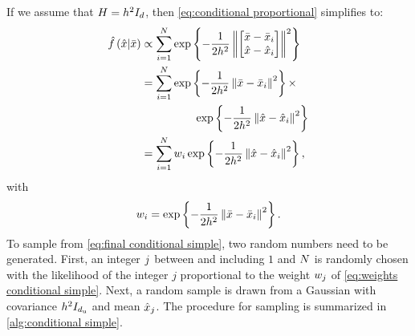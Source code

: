If we assume that $H=h^2I_{d}$, then \cref{eq:conditional proportional} simplifies to:
\begin{align}
	\densityestcond{\variablepartb}{\variableparta} 
	&\propto \sum_{\indexdata=1}^{\numberofsamples}
	\e{
		-\frac{1}{2h^2} \normtwo{
			\begin{bmatrix}
				\variableparta - \datapointparta{\indexdata} \\ 
				\variablepartb - \datapointpartb{\indexdata}
			\end{bmatrix}
		}^2
	} \nonumber \\
	&= \sum_{\indexdata=1}^{\numberofsamples}
	\e{-\frac{1}{2h^2} \normtwo{\variableparta - \datapointparta{\indexdata}}^2} \times \nonumber \\
	& \superquad \e{-\frac{1}{2h^2} \normtwo{\variablepartb - \datapointpartb{\indexdata}}^2} \nonumber \\
	&= \sum_{\indexdata=1}^{\numberofsamples} \weight{\indexdata}
	\e{-\frac{1}{2h^2} \normtwo{\variablepartb - \datapointpartb{\indexdata}}^2}, \label{eq:final conditional simple}
\end{align}
with 
\begin{equation}
	\label{eq:weights conditional simple}
	w_{i}=\exp\left\{ -\frac{1}{2h^2} \left\Vert \bar{x} - \bar{x}_{i} \right\Vert^2 \right\}.
\end{equation} 
To sample from \cref{eq:final conditional simple}, two random numbers need to be generated. 
First, an integer $j$ between and including $1$ and $N$ is randomly chosen with the likelihood of the integer $j$ proportional to the weight $w_{j}$ of \cref{eq:weights conditional simple}. 
Next, a random sample is drawn from a Gaussian with covariance $h^2 I_{d_\mathrm{u}}$ and mean $\hat{x}_{j}$.
The procedure for sampling is summarized in \cref{alg:conditional simple}.


